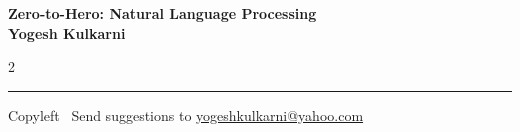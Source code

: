 \documentclass[8pt,landscape]{article}
\begin{document}
\footnotesize


\begin{center}
\Large{\textbf{Zero-to-Hero: Natural Language Processing\\ Yogesh Kulkarni}}  
\end{center}

\begin{multicols}{2}

\end{multicols}

\rule{\linewidth}{0.25pt}
\scriptsize
Copyleft \textcopyleft\  Send suggestions to 
\href{http://www.yogeshkulkarni.com}{yogeshkulkarni@yahoo.com}
\end{document}
